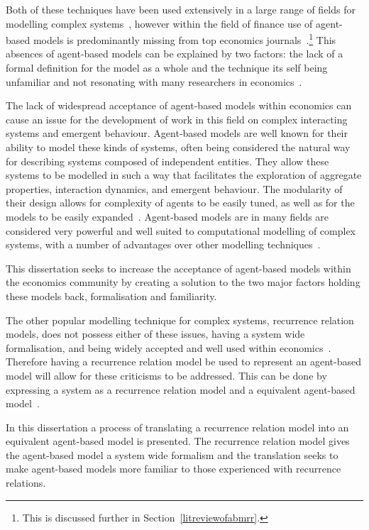 \documentclass{article}
\begin{document}
Both of these techniques have been used extensively in a large range of fields for modelling complex systems~\cite{wsabm}, however within the field of finance use of agent-based models is predominantly missing from top economics journals~\cite{whereabmp, farmerfoleynature}.\footnote{This is discussed further in Section~\ref{litreviewofabmrr}.} This absences of agent-based models can be explained by two factors: the lack of a formal definition for the model as a whole and the technique its self being unfamiliar and not resonating with many researchers in economics~\cite{farmerfoleynature}. 

The lack of widespread acceptance of agent-based models within economics can cause an issue for the development of work in this field on complex interacting systems and emergent behaviour. Agent-based models are well known for their ability to model these kinds of systems, often being considered the natural way for describing systems composed of independent entities. They allow these systems to be modelled in such a way that facilitates the exploration of aggregate properties, interaction dynamics, and emergent behaviour. The modularity of their design allows for complexity of agents to be easily tuned, as well as for the models to be easily expanded~\cite{techsadsProbsabm}. Agent-based models are in many fields are considered very powerful and well suited to computational modelling of complex systems, with a number of advantages over other modelling techniques~\cite{whereabmp, abmgood1, abmgreat2, gabm3, gabm5}. 

This dissertation seeks to increase the acceptance of agent-based models within the economics community by creating a solution to the two major factors holding these models back, formalisation and familiarity. 

The other popular modelling technique for complex systems, recurrence relation models, does not possess either of these issues, having a system wide formalisation, and being widely accepted and well used within economics~\cite{acrr, rra10, rra1}. Therefore having a recurrence relation model be used to represent an agent-based model will allow for these criticisms to be addressed. This can be done by expressing a system as a recurrence relation model and a equivalent agent-based model~\cite{agbtorrgood}. 

In this dissertation a process of translating a recurrence relation model into an equivalent agent-based model is presented. The recurrence relation model gives the agent-based model a system wide formalism and the translation seeks to make agent-based models more familiar to those experienced with recurrence relations. 
\end{document}
